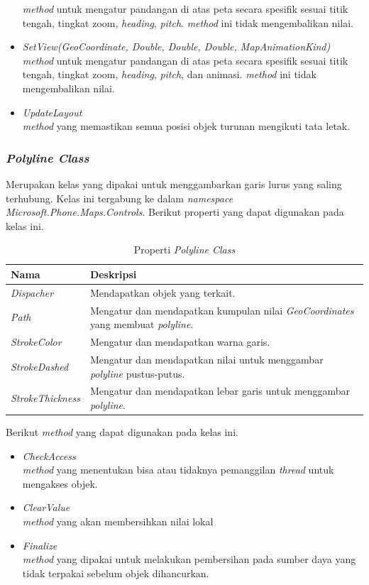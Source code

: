 \begin{itemize}
	\textit{method} untuk mengatur pandangan di atas peta secara spesifik sesuai titik tengah, tingkat zoom, \textit{heading}, \textit{pitch}. \textit{method} ini tidak mengembalikan nilai.
	\item \textit{SetView(GeoCoordinate, Double, Double, Double, MapAnimationKind)} \\
	\textit{method} untuk mengatur pandangan di atas peta secara spesifik sesuai titik tengah, tingkat zoom, \textit{heading}, \textit{pitch}, dan animasi. \textit{method} ini tidak mengembalikan nilai.
	\item \textit{UpdateLayout} \\
	\textit{method} yang memastikan semua posisi objek turunan mengikuti tata letak. 
\end{itemize}

\subsubsection{\textit{Polyline Class}}
\label{subsubsec:Polyline Class}
\hspace{0.5cm} Merupakan kelas yang dipakai untuk menggambarkan garis lurus yang saling terhubung. Kelas ini tergabung ke dalam \textit{namespace Microsoft.Phone.Maps.Controls}. 
\newpage
Berikut properti yang dapat digunakan pada kelas ini.
\begin{table}[h]
	\centering
		\begin{tabular}{ |p{4cm}|p{10cm}|}
				\hline
					Nama & Deskripsi \\ \hline
					\textit{Dispacher} & Mendapatkan objek yang terkait. \\ \hline
					\textit{Path} & Mengatur dan mendapatkan kumpulan nilai \textit{GeoCoordinates} yang membuat \textit{polyline}. \\ \hline
					\textit{StrokeColor} & Mengatur dan mendapatkan warna garis. \\ \hline
					\textit{StrokeDashed} & Mengatur dan mendapatkan nilai untuk menggambar \textit{polyline} pustus-putus. \\ \hline
					\textit{StrokeThickness} & Mengatur dan mendapatkan lebar garis untuk menggambar \textit{polyline}. \\ \hline
				\hline
		\end{tabular}
	\caption{Properti \textit{Polyline Class}}
	\label{tab:PropertiKelasPolyline}
\end{table}

Berikut \textit{method} yang dapat digunakan pada kelas ini.
\begin{itemize}
	\item \textit{CheckAccess}\\
	\textit{method} yang menentukan bisa atau tidaknya pemanggilan \textit{thread} untuk mengakses objek.
	\item \textit{ClearValue}\\
	\textit{method} yang akan membersihkan nilai lokal
	\item \textit{Finalize} \\
	\textit{method} yang dipakai untuk melakukan pembersihan pada sumber daya yang tidak terpakai sebelum objek dihancurkan.
\end{itemize}

